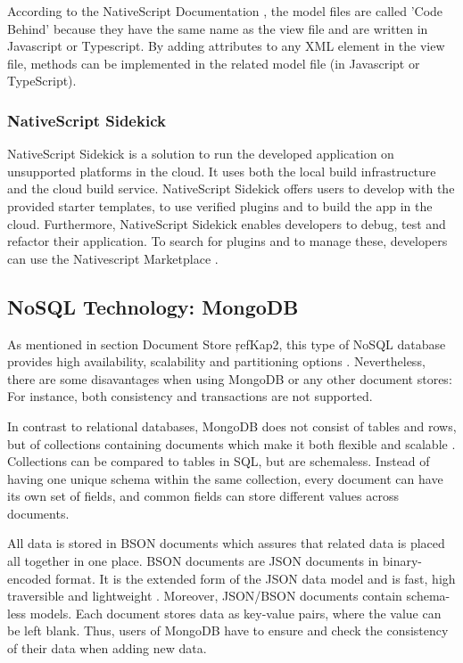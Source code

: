 According to the NativeScript Documentation \cite{nativescript}, the model files are called 'Code Behind' because they have the same name as the view file and are written in Javascript or Typescript. By adding attributes to any XML element in the view file, methods can be implemented in the related model file (in Javascript or TypeScript). 

\subsubsection{NativeScript Sidekick}\label{Native}

NativeScript Sidekick is a solution to run the developed application on unsupported platforms in the cloud. It uses both the local build infrastructure and the cloud build service. NativeScript Sidekick offers users to develop with the provided starter templates, to use verified plugins and to build the app in the cloud. Furthermore, NativeScript Sidekick enables developers to debug, test and refactor their application. 
To search for plugins and to manage these, developers can use the Nativescript Marketplace \cite{nsmarket}.

\subsection{NoSQL Technology: MongoDB}\label{mongodb}

As mentioned in section Document Store \c ref{Kap2}, this type of NoSQL database provides high availability, scalability and partitioning options \cite[p.25 ff.]{mongodb_edward}. Nevertheless, there are some disavantages when using MongoDB or any other document stores: For instance, both consistency and transactions are not supported. 

In contrast to relational databases, MongoDB does not consist of tables and rows, but of collections containing documents which make it both flexible and scalable \cite[p.25 ff.]{mongodb_edward}. Collections can be compared to tables in SQL, but are schemaless. Instead of having one unique schema within the same collection, every document can have its own set of fields, and common fields can store different values across documents.  

All data is stored in \ac{BSON} documents which assures that related data is placed all together in one place. BSON documents are JSON documents in binary-encoded format. It is the extended form of the JSON data model and is fast, high traversible and lightweight \cite[p.31 ff.]{mongodb_edward}. Moreover, JSON/BSON documents contain schema-less models. Each document stores data as key-value pairs, where the value can be left blank. Thus, users of MongoDB have to ensure and check the consistency of their data when adding new data.

